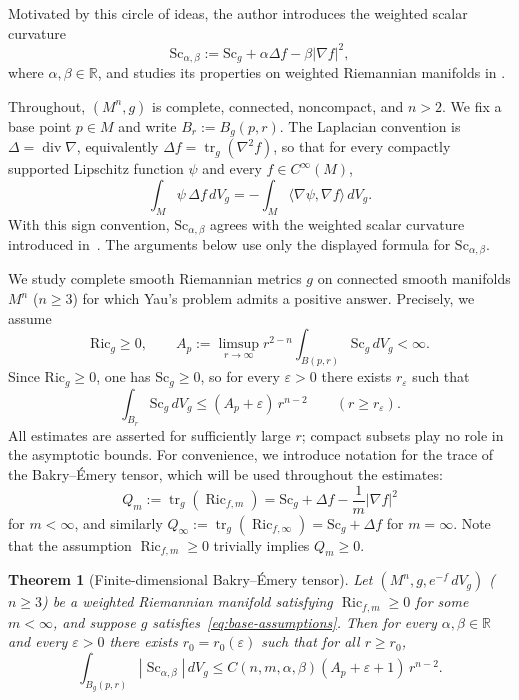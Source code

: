 \documentclass[12pt,oneside,a4paper]{article}
\theoremstyle{mytheorem}
\newtheorem{theorem}[definition]{Theorem}
\theoremstyle{remark}
\begin{document}
 Motivated by this circle of ideas, the author introduces  the weighted scalar curvature 
\[
  \mathrm{Sc}_{\alpha,\beta}
  :=
  \mathrm{Sc}_g+\alpha\Delta f-\beta|\nabla f|^2,
\]
where $\alpha,\beta\in\mathbb R$, and studies its properties on weighted
Riemannian manifolds in
\cite[Section~4]{zbMATH07342230}.  




Throughout, $(M^n,g)$ is complete, connected, noncompact, and $n>2$.
We fix a base point $p\in M$ and write $B_r:=B_g(p,r)$.
The Laplacian convention is $\Delta=\operatorname{div}\nabla$, equivalently
$\Delta f=\operatorname{tr}_g(\nabla^2 f)$, so that for every compactly
supported Lipschitz function $\psi$ and every $f\in C^\infty(M)$,
\[
  \int_M \psi\,\Delta f\,dV_g
  =
  -\int_M \langle\nabla\psi,\nabla f\rangle\,dV_g.
\]
With this sign convention, $\mathrm{Sc}_{\alpha,\beta}$ agrees with the
weighted scalar curvature introduced in~\cite[Section~4]{zbMATH07342230}.
The arguments below use only the displayed formula for
$\mathrm{Sc}_{\alpha,\beta}$.

We study complete smooth Riemannian metrics $g$ on connected smooth manifolds
$M^n$ ($n\geq 3$) for which Yau's problem admits a positive answer.
Precisely, we assume
\begin{equation}\label{eq:base-assumptions}
  \mathrm{Ric}_g\geq 0,
  \qquad
  A_p:=\limsup_{r\to\infty}
  r^{2-n}\int_{B(p,r)}\mathrm{Sc}_g\,dV_g<\infty.
\end{equation}
Since $\mathrm{Ric}_g\ge 0$, one has $\mathrm{Sc}_g\ge 0$, so for every
$\varepsilon>0$ there exists $r_\varepsilon$ such that
\begin{equation}\label{eq:scalar-growth-eps}
  \int_{B_r}\mathrm{Sc}_g\,dV_g
  \le (A_p+\varepsilon)\,r^{n-2}
  \qquad(r\ge r_\varepsilon).
\end{equation}
All estimates are asserted for sufficiently large $r$; compact subsets play
no role in the asymptotic bounds. For convenience, we introduce  notation for the trace of the Bakry--\'Emery 
tensor, which will be used throughout the estimates:
\[
  Q_m := \operatorname{tr}_g(\operatorname{Ric}_{f,m})
  = \mathrm{Sc}_g + \Delta f - \frac{1}{m}|\nabla f|^2
\]
for $m<\infty$, and similarly $Q_\infty := \operatorname{tr}_g(\operatorname{Ric}_{f,\infty}) = \mathrm{Sc}_g + \Delta f$ for $m=\infty$.
Note that the assumption $\operatorname{Ric}_{f,m} \geq 0$ trivially implies $Q_m \geq 0$.

\begin{theorem}[Finite-dimensional Bakry--\'Emery tensor]
\label{thm:finite-m}
Let $(M^n,g,e^{-f}\,dV_g)$ ($n\geq 3$) be a weighted Riemannian manifold
satisfying $\operatorname{Ric}_{f,m}\geq 0$ for some $m<\infty$, and suppose
$g$ satisfies~\eqref{eq:base-assumptions}.
Then for every $\alpha,\beta\in\mathbb{R}$ and every $\varepsilon>0$ there
exists $r_0=r_0(\varepsilon)$ such that for all $r\geq r_0$,
\begin{equation}\label{eq:finite-absolute-main}
  \int_{B_g(p,r)}|\operatorname{Sc}_{\alpha,\beta}|\,dV_g
  \leq C(n,m,\alpha,\beta)(A_p+\varepsilon+1)\,r^{n-2}.
\end{equation}
\end{theorem}
\end{document}

